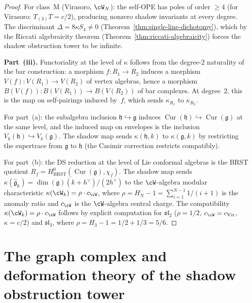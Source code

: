 \begin{proof}
For class~M (Virasoro, $\cW_N$): the self-OPE has poles of order
$\geq 4$ (for Virasoro: $T_{(3)} T = c/2$), producing nonzero
shadow invariants at every degree. The discriminant
$\Delta = 8\kappa S_4 \neq 0$
(Theorem~\ref{thm:single-line-dichotomy}),
which by the Riccati algebraicity theorem
(Theorem~\ref{thm:riccati-algebraicity}) forces the shadow obstruction tower
to be infinite.

\textbf{Part~(iii).}
Functoriality at the level of $\kappa$ follows from the
degree-$2$ naturality of the bar construction: a morphism
$f \colon R_1 \to R_2$ induces a morphism
$V(f) \colon V(R_1) \to V(R_2)$ of vertex algebras, hence a
morphism $B(V(f)) \colon B(V(R_1)) \to B(V(R_2))$ of bar
complexes. At degree~$2$, this is the map on self-pairings
induced by~$f$, which sends $\kappa_{R_1}$ to $\kappa_{R_2}$.

For part~(a): the subalgebra inclusion
$\mathfrak{h} \hookrightarrow \mathfrak{g}$ induces
$\operatorname{Cur}(\mathfrak{h}) \hookrightarrow
\operatorname{Cur}(\mathfrak{g})$ at the same level, and the
induced map on envelopes is the inclusion
$V_k(\mathfrak{h}) \hookrightarrow V_k(\mathfrak{g})$.
The shadow map sends $\kappa(\mathfrak{h}, k)$ to
$\kappa(\mathfrak{g}, k)$ by restricting the supertrace from
$\mathfrak{g}$ to $\mathfrak{h}$ (the Casimir correction
restricts compatibly).

For part~(b): the DS reduction at the level of Lie conformal
algebras is the BRST quotient
$R_f = H^0_{\mathrm{BRST}}(\operatorname{Cur}(\mathfrak{g}),
\chi_f)$. The shadow map sends $\kappa(\widehat{\mathfrak{g}}_k)
= \dim(\mathfrak{g})(k + h^\vee)/(2h^\vee)$ to the $\cW$-algebra
modular characteristic
$\kappa(\cW_k) = \rho \cdot c_{\cW}$, where
$\rho = H_N - 1 = \sum_{i=1}^{N-1} 1/(i+1)$ is the anomaly
ratio and $c_{\cW}$ is the $\cW$-algebra central charge.
The compatibility
$\kappa(\cW_k) = \rho \cdot c_{\cW}$ follows by explicit
computation for $\mathfrak{sl}_2$ ($\rho = 1/2$,
$c_{\cW} = c_{\mathrm{Vir}}$, $\kappa = c/2$) and
$\mathfrak{sl}_3$, where
$\rho=H_3-1=1/2+1/3=5/6$.
\end{proof}



\section{The graph complex and deformation theory of the shadow obstruction tower}
\label{sec:graph-complex-shadow-deformation}

